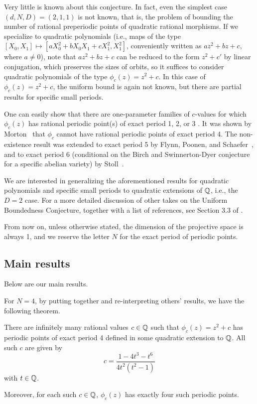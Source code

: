 Very little is known about this conjecture. In fact, even the simplest
case $(d, N, D) = (2, 1, 1)$ is not known, that is, the problem of
bounding the number of rational preperiodic points of quadratic
rational morphisms. If we specialize to quadratic polynomials (i.e.,
maps of the type $[X_0, X_1] \mapsto [a X_0^2 + b X_0 X_1 + c X_1^2,
X_1^2]$, conveniently written as $a z^2 + b z + c$, where $a \ne 0$),
note that $a z^2 + b z + c$ can be reduced to the form $z^2 + c'$ by
linear conjugation, which preserves the sizes of orbits, so it
suffices to consider quadratic polynomials of the type $\phi_c(z) =
z^2 + c$. In this case of $\phi_c(z) = z^2 + c$, the uniform bound is
again not known, but there are partial results for specific small
periods.

One can easily show that there are one-parameter families of
$c$-values for which $\phi_c(z)$ has rational periodic point(s) of
exact period 1, 2, or 3 \cite{MR1199627}. It was shown by
Morton~\cite{MR1665198} that $\phi_c$ cannot have rational periodic
points of exact period 4. The non-existence result was extended to
exact period 5 by Flynn, Poonen, and Schaefer~\cite{MR1480542}, and to
exact period 6 (conditional on the Birch and Swinnerton-Dyer
conjecture for a specific abelian variety) by Stoll~\cite{MR2465796}.

We are interested in generalizing the aforementioned results for
quadratic polynomials and specific small periods to quadratic
extensions of $\mathbb{Q}$, i.e., the $D = 2$ case. For a more detailed
discussion of other takes on the Uniform Boundedness Conjecture,
together with a list of references, see Section 3.3 of
\cite{MR2316407}.

From now on, unless otherwise stated, the dimension of the projective
space is always 1, and we reserve the letter $N$ for the exact period
of periodic points.

\subsection{Main results}
\label{subsec:results}

Below are our main results.

For $N = 4$, by putting together and re-interpreting others' results,
we have the following theorem.

\begin{theorem}
  \label{th:n=4-infinite}
  There are infinitely many rational values $c \in \mathbb{Q}$ such that
  $\phi_c(z) = z^2 + c$ has periodic points of exact period 4 defined
  in some quadratic extension to $\mathbb{Q}$. All such $c$ are given by
  \[
  c = \frac{1 - 4t^3 - t^6}{4t^2(t^2 - 1)}
  \]
  with $t \in \mathbb{Q}$.

  Moreover, for each such $c \in \mathbb{Q}$, $\phi_c(z)$ has exactly four
  such periodic points.
\end{theorem}

